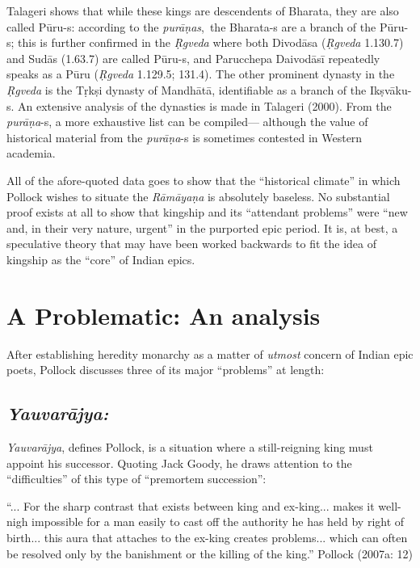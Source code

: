 Talageri shows that while these kings are descendents of Bharata, they are also called Pūru-s: according to the {\sl purāṇas}, the Bharata-s are a branch of the Pūru-s; this is further confirmed in the {\sl Ṛgveda} where both Divodāsa ({\sl Ṛgveda} 1.130.7) and Sudās (1.63.7) are called Pūru-s, and Parucchepa Daivodāsī repeatedly speaks as a Pūru ({\sl Ṛgveda} 1.129.5; 131.4). The other prominent dynasty in the {\sl Ṛgveda} is the Tṛkṣi dynasty of Mandhātā, identifiable as a branch of the Ikṣvāku-s. An extensive analysis of the dynasties is made in Talageri (2000). From the {\sl purāṇa}-s, a more exhaustive list can be compiled--- although the value of historical material from the {\sl purāṇa}-s is sometimes contested in Western academia.

All of the afore-quoted data goes to show that the “historical climate” in which Pollock wishes to situate the {\sl Rāmāyaṇa} is absolutely baseless. No substantial proof exists at all to show that kingship and its “attendant problems” were “new and, in their very nature, urgent” in the purported epic period. It is, at best, a speculative theory that may have been worked backwards to fit the idea of kingship as the “core” of Indian epics.  

\section{A Problematic: An analysis}\label{sec1.2}

After establishing heredity monarchy as a matter of {\sl utmost} concern of Indian epic poets, Pollock discusses three of its major “problems” at length: 

\subsection{{\sl\bfseries Yauvarājya:}}\label{sec1.2.1}

{\sl Yauvarājya}, defines Pollock, is a situation where a still-reigning king must appoint his successor. Quoting Jack Goody, he draws attention to the “difficulties” of this type of “premortem succession”:

\begin{myquote}
 “... For the sharp contrast that exists between king and ex-king... makes it well-nigh impossible for a man easily to cast off the authority he has held by right of birth... this aura that attaches to the ex-king creates problems... which can often be resolved only by the banishment or the killing of the king.” 
\hfill Pollock (2007a: 12)
\end{myquote}

